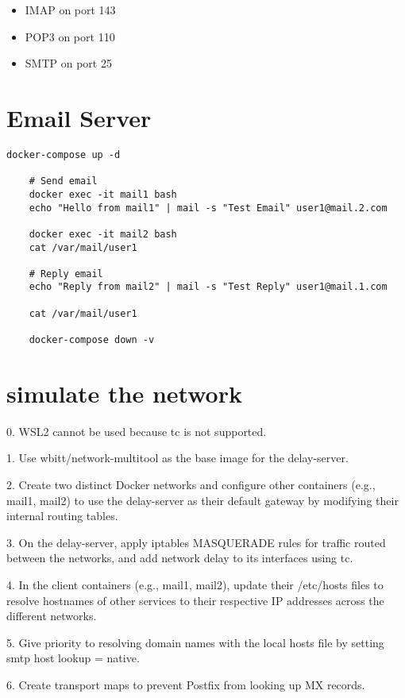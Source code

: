 \begin{itemize}
  \item IMAP on port 143
  \item POP3 on port 110
  \item SMTP on port 25
\end{itemize}

\section{Email Server}

\begin{lstlisting}[caption={Run Email Server Using Docker}]
    docker-compose up -d
    
    # Send email
    docker exec -it mail1 bash
    echo "Hello from mail1" | mail -s "Test Email" user1@mail.2.com
    
    docker exec -it mail2 bash
    cat /var/mail/user1
    
    # Reply email
    echo "Reply from mail2" | mail -s "Test Reply" user1@mail.1.com
    
    cat /var/mail/user1
    
    docker-compose down -v
\end{lstlisting}

\section{simulate the network}
0. WSL2 cannot be used because tc is not supported.

1. Use wbitt/network-multitool as the base image for the delay-server.

2. Create two distinct Docker networks and configure other containers (e.g., mail1, mail2) to use the delay-server as their default gateway by modifying their internal routing tables.

3. On the delay-server, apply iptables MASQUERADE rules for traffic routed between the networks, and add network delay to its interfaces using tc.

4. In the client containers (e.g., mail1, mail2), update their /etc/hosts files to resolve hostnames of other services to their respective IP addresses across the different networks.

5. Give priority to resolving domain names with the local hosts file by setting smtp host lookup = native.

6. Create transport maps to prevent Postfix from looking up MX records.

